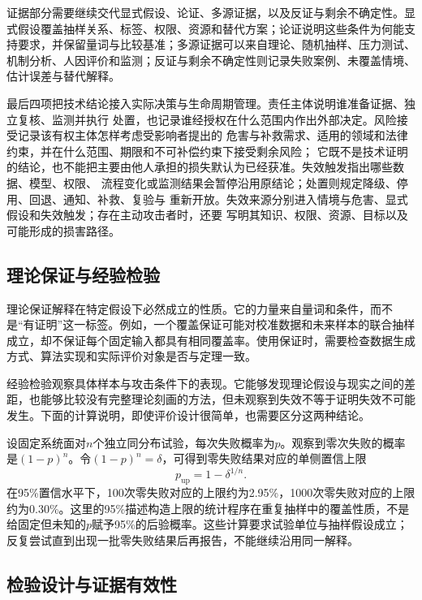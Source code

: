 证据部分需要继续交代显式假设、论证、多源证据，以及反证与剩余不确定性。显式假设覆盖抽样关系、标签、权限、资源和替代方案；论证说明这些条件为何能支持要求，并保留量词与比较基准；多源证据可以来自理论、随机抽样、压力测试、机制分析、人因评价和监测；反证与剩余不确定性则记录失败案例、未覆盖情境、估计误差与替代解释。

最后四项把技术结论接入实际决策与生命周期管理。责任主体说明谁准备证据、独立复核、监测并执行
处置，也记录谁经授权在什么范围内作出外部决定。风险接受记录该有权主体怎样考虑受影响者提出的
危害与补救需求、适用的领域和法律约束，并在什么范围、期限和不可补偿约束下接受剩余风险；
它既不是技术证明的结论，也不能把主要由他人承担的损失默认为已经获准。失效触发指出哪些数据、模型、权限、
流程变化或监测结果会暂停沿用原结论；处置则规定降级、停用、回退、通知、补救、复验与
重新开放。失效来源分别进入情境与危害、显式假设和失效触发；存在主动攻击者时，还要
写明其知识、权限、资源、目标以及可能形成的损害路径。

\subsection{理论保证与经验检验}

理论保证解释在特定假设下必然成立的性质。它的力量来自量词和条件，而不是“有证明”这一标签。例如，一个覆盖保证可能对校准数据和未来样本的联合抽样成立，却不保证每个固定输入都具有相同覆盖率。使用保证时，需要检查数据生成方式、算法实现和实际评价对象是否与定理一致。

经验检验观察具体样本与攻击条件下的表现。它能够发现理论假设与现实之间的差距，也能够比较没有完整理论刻画的方法，但未观察到失效不等于证明失效不可能发生。下面的计算说明，即使评价设计很简单，也需要区分这两种结论。

\begin{example}[零次失败的含义]
\label{ex:trust-zero-failures}
设固定系统面对$n$个独立同分布试验，每次失败概率为$p$。观察到零次失败的概率是$(1-p)^n$。令$(1-p)^n=\delta$，可得到零失败结果对应的单侧置信上限
\[
 p_{\mathrm{up}}=1-\delta^{1/n}.
\]
在95\%置信水平下，100次零失败对应的上限约为2.95\%，1000次零失败对应的上限约为0.30\%。这里的95\%描述构造上限的统计程序在重复抽样中的覆盖性质，不是给固定但未知的$p$赋予95\%的后验概率。这些计算要求试验单位与抽样假设成立；反复尝试直到出现一批零失败结果后再报告，不能继续沿用同一解释。
\end{example}

\subsection{检验设计与证据有效性}

